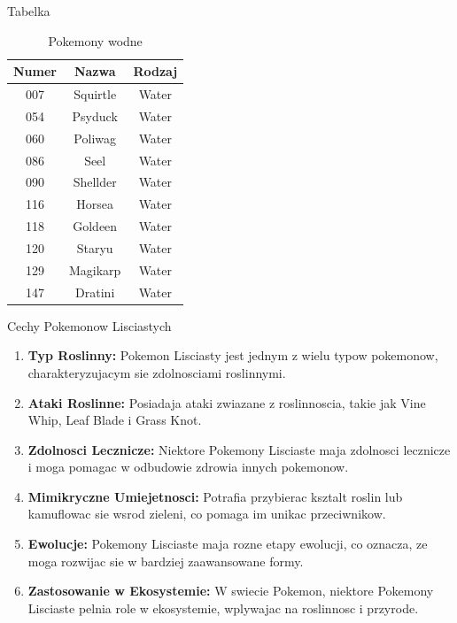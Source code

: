 \documentclass{beamer}
\begin{document}
\begin{frame}{Tabelka}
  \begin{table}
    \centering
    \begin{tabular}{|c|c|c|}
    \hline
    \textbf{Numer} & \textbf{Nazwa} & \textbf{Rodzaj} \\
    \hline
    007 & Squirtle & Water \\
    054 & Psyduck & Water \\
    060 & Poliwag & Water \\
    086 & Seel & Water \\
    090 & Shellder & Water \\
    116 & Horsea & Water \\
    118 & Goldeen & Water \\
    120 & Staryu & Water \\
    129 & Magikarp & Water \\
    147 & Dratini & Water \\
    \hline
  \end{tabular}
  \caption{Pokemony wodne}
    \label{tab:tabela0}
  \end{table}
\end{frame}


\begin{frame}{Cechy Pokemonow Lisciastych}
  \begin{enumerate}
    \item \textbf{Typ Roslinny:} Pokemon Lisciasty jest jednym z wielu typow pokemonow, charakteryzujacym sie zdolnosciami roslinnymi.

    \item \textbf{Ataki Roslinne:} Posiadaja ataki zwiazane z roslinnoscia, takie jak Vine Whip, Leaf Blade i Grass Knot.

    \item \textbf{Zdolnosci Lecznicze:} Niektore Pokemony Lisciaste maja zdolnosci lecznicze i moga pomagac w odbudowie zdrowia innych pokemonow.

    \item \textbf{Mimikryczne Umiejetnosci:} Potrafia przybierac ksztalt roslin lub kamuflowac sie wsrod zieleni, co pomaga im unikac przeciwnikow.

    \item \textbf{Ewolucje:} Pokemony Lisciaste maja rozne etapy ewolucji, co oznacza, ze moga rozwijac sie w bardziej zaawansowane formy.

    \item \textbf{Zastosowanie w Ekosystemie:} W swiecie Pokemon, niektore Pokemony Lisciaste pelnia role w ekosystemie, wplywajac na roslinnosc i przyrode.
  \end{enumerate}
\end{frame}
\end{document}

